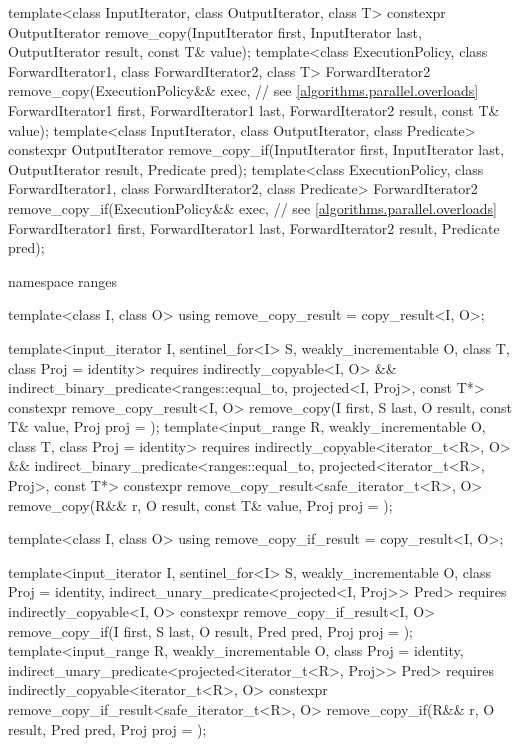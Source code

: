 \begin{codeblock}
{  template<class InputIterator, class OutputIterator, class T>
    constexpr OutputIterator
      remove_copy(InputIterator first, InputIterator last,
                  OutputIterator result, const T& value);
  template<class ExecutionPolicy, class ForwardIterator1, class ForwardIterator2,
           class T>
    ForwardIterator2
      remove_copy(ExecutionPolicy&& exec,                       // see \ref{algorithms.parallel.overloads}
                  ForwardIterator1 first, ForwardIterator1 last,
                  ForwardIterator2 result, const T& value);
  template<class InputIterator, class OutputIterator, class Predicate>
    constexpr OutputIterator
      remove_copy_if(InputIterator first, InputIterator last,
                     OutputIterator result, Predicate pred);
  template<class ExecutionPolicy, class ForwardIterator1, class ForwardIterator2,
           class Predicate>
    ForwardIterator2
      remove_copy_if(ExecutionPolicy&& exec,                    // see \ref{algorithms.parallel.overloads}
                     ForwardIterator1 first, ForwardIterator1 last,
                     ForwardIterator2 result, Predicate pred);

  namespace ranges {
    template<class I, class O>
    using remove_copy_result = copy_result<I, O>;

    template<input_iterator I, sentinel_for<I> S, weakly_incrementable O, class T,
             class Proj = identity>
      requires indirectly_copyable<I, O> &&
               indirect_binary_predicate<ranges::equal_to, projected<I, Proj>, const T*>
      constexpr remove_copy_result<I, O>
        remove_copy(I first, S last, O result, const T& value, Proj proj = {});
    template<input_range R, weakly_incrementable O, class T, class Proj = identity>
      requires indirectly_copyable<iterator_t<R>, O> &&
               indirect_binary_predicate<ranges::equal_to,
                                         projected<iterator_t<R>, Proj>, const T*>
      constexpr remove_copy_result<safe_iterator_t<R>, O>
        remove_copy(R&& r, O result, const T& value, Proj proj = {});

    template<class I, class O>
    using remove_copy_if_result = copy_result<I, O>;

    template<input_iterator I, sentinel_for<I> S, weakly_incrementable O,
             class Proj = identity, indirect_unary_predicate<projected<I, Proj>> Pred>
      requires indirectly_copyable<I, O>
      constexpr remove_copy_if_result<I, O>
        remove_copy_if(I first, S last, O result, Pred pred, Proj proj = {});
    template<input_range R, weakly_incrementable O, class Proj = identity,
             indirect_unary_predicate<projected<iterator_t<R>, Proj>> Pred>
      requires indirectly_copyable<iterator_t<R>, O>
      constexpr remove_copy_if_result<safe_iterator_t<R>, O>
        remove_copy_if(R&& r, O result, Pred pred, Proj proj = {});
  }

}
\end{codeblock}
